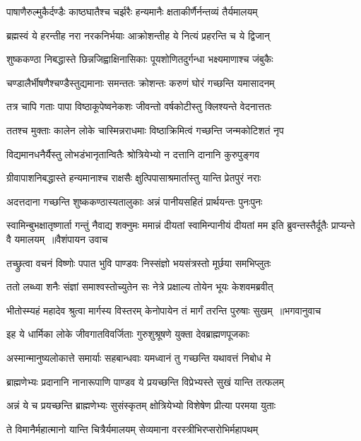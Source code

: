 \twolineshloka
{पाषाणैरुल्मुकैर्दण्डैः काष्ठघातैश्च चर्झरैः}
{हन्यमानैः क्षताकीर्णैर्नन्तव्यं तैर्यमालयम्}


\twolineshloka
{ब्रह्मस्वं ये हरन्तीह नरा नरकनिर्भयाः}
{आक्रोशन्तीह ये नित्यं प्रहरन्ति च ये द्विजान्}


\twolineshloka
{शुष्ककण्ठा निबद्धास्ते छिन्नजिह्वाक्षिनासिकाः}
{पूयशोणितदुर्गन्धा भक्ष्यमाणाश्च जंबुकैः}


\twolineshloka
{चण्डालैर्भीषणैश्चण्डैस्तुद्यमानाः समन्ततः}
{क्रोशन्तः करुणं घोरं गच्छन्ति यमासादनम्}


\twolineshloka
{तत्र चापि गताः पापा विष्ठाकूपेष्वनेकशः}
{जीवन्तो वर्षकोटीस्तु क्लिश्यन्ते वेदनात्ततः}


\twolineshloka
{ततश्च मुक्ताः कालेन लोके चास्मिन्नराधमाः}
{विष्ठाक्रिमित्वं गच्छन्ति जन्मकोटिशतं नृप}


\twolineshloka
{विद्यमानधनैर्यैस्तु लोभडंभानृतान्वितैः}
{श्रोत्रियेभ्यो न दत्तानि दानानि कुरुपुङ्गव}


\twolineshloka
{ग्रीवापाशनिबद्धास्ते हन्यमानाश्च राक्षसैः}
{क्षुत्पिपासाश्रमार्तास्तु यान्ति प्रेतपुरं नराः}


\twolineshloka
{अदत्तदाना गच्छन्ति शुष्ककण्ठास्यतालुकाः}
{अन्नं पानीयसहितं प्रार्थयन्तः पुनःपुनः}


\fourlineindentedshloka
{स्वामिन्बुभक्षातृष्णार्ता गन्तुं नैवाद्य शक्नुमः}
{ममान्नं दीयतां स्वामिन्पानीयं दीयतां मम}
{इति ब्रुवन्तस्तैर्दूतैः प्राप्यन्ते वै यमालयम् ॥वैशंपायन उवाच}
{}


\twolineshloka
{तच्छ्रुत्वा वचनं विष्णोः पपात भुवि पाण्डवः}
{निस्संज्ञो भयसंत्रस्तो मूर्छया समभिप्लुतः}


\twolineshloka
{ततो लब्ध्वा शनैः संज्ञां समाश्वस्तोच्युतेन सः}
{नेत्रे प्रक्षाल्य तोयेन भूयः केशवमब्रवीत्}


\threelineshloka
{भीतोस्म्यहं महादेव श्रुत्वा मार्गस्य विस्तरम्}
{केनोपायेन तं मार्गं तरन्ति पुरुषाः सुखम् ॥भगवानुवाच}
{}


\twolineshloka
{इह ये धार्मिका लोके जीवगातविवर्जिताः}
{गुरुशुश्रूषणे युक्ता देवब्राह्मणपूजकाः}


\twolineshloka
{अस्मान्मानुष्यलोकात्ते समार्याः सहबान्धवाः}
{यमध्वानं तु गच्छन्ति यथावत्तं निबोध मे}


\twolineshloka
{ब्राह्मणेभ्यः प्रदानानि नानारूपाणि पाण्डव}
{ये प्रयच्छन्ति विप्रेभ्यस्ते सुखं यान्ति तत्फलम्}


\twolineshloka
{अन्नं ये च प्रयच्छन्ति ब्राह्मणेभ्यः सुसंस्कृतम्}
{क्षोत्रियेभ्यो विशेषेण प्रीत्या परमया युताः}


\twolineshloka
{ते विमानैर्महात्मानो यान्ति चित्रैर्यमालयम्}
{सेव्यमाना वरस्त्रीभिरप्सरोभिर्महापथम्}


